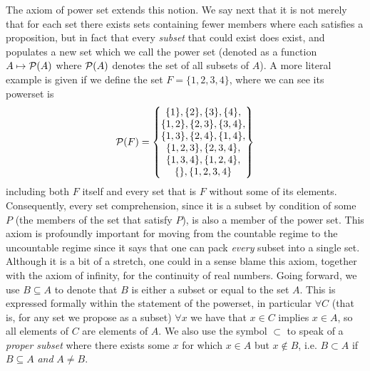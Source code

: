 \documentclass[11pt]{article}
\begin{document}
The axiom of power set extends this notion. We say next that it is not merely that for each set there exists sets containing fewer members where each satisfies a proposition, but in fact that every \emph{subset} that could exist does exist, and populates a new set which we call the power set (denoted as a function $A \mapsto \mathcal{P}(A)$ where $\mathcal{P}(A)$ denotes the set of all subsets of $A$). A more literal example is given if we define the set $F = \{1,2,3,4\}$, where we can see its powerset is \begin{gather*}\mathcal{P}(F) = \left\{
\begin{matrix}
\{1\},\{2\},\{3\},\{4\}, \\
\{1,2\},\{2,3\},\{3,4\}, \\
\{1,3\},\{2,4\},\{1,4\}, \\
\{1,2,3\},\{2,3,4\}, \\
\{1,3,4\},\{1,2,4\}, \\
\{\},\{1,2,3,4\}
\end{matrix}
\right\}
\end{gather*}
including both $F$ itself and every set that is $F$ without some of its elements. Consequently, every set comprehension, since it is a subset by condition of some $P$ (the members of the set that satisfy $P$), is also a member of the power set. This axiom is profoundly important for moving from the countable regime to the uncountable regime since it says that one can pack \emph{every} subset into a single set. Although it is a bit of a stretch, one could in a sense blame this axiom, together with the axiom of infinity, for the continuity of real numbers. Going forward, we use $B \subseteq A$ to denote that $B$ is either a subset or equal to the set $A$. This is expressed formally within the statement of the powerset, in particular $\forall C$ (that is, for any set we propose as a subset) $\forall x$ we have that $x \in C$ implies $x \in A$, so all elements of $C$ are elements of $A$. We also use the symbol $\subset$ to speak of a \emph{proper subset} where there exists some $x$ for which $x \in A$ but $x \notin B$, i.e. $B \subset A$ if $B \subseteq A$ \emph{and} $A \neq B$.
\end{document}
